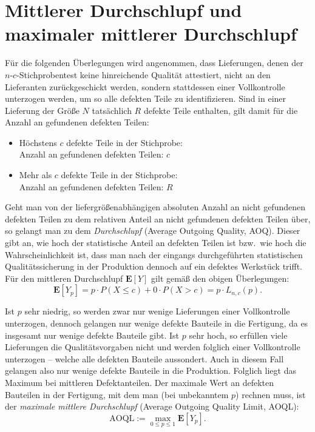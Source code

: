 \documentclass[a4paper,11pt,oneside]{article}
\begin{document}
\section{Mittlerer Durchschlupf und maximaler mittlerer Durchschlupf}

Für die folgenden Überlegungen wird angenommen, dass Lieferungen, denen der $n$-$c$-Stichprobentest keine hinreichende Qualität attestiert, nicht an den Lieferanten zurückgeschickt werden, sondern stattdessen einer Vollkontrolle unterzogen werden, um so alle defekten Teile zu identifizieren. Sind in einer Lieferung der Größe $N$ tatsächlich $R$ defekte Teile enthalten, gilt damit für die Anzahl an gefundenen defekten Teilen:

\begin{itemize}
\item
Höchstens $c$ defekte Teile in der Stichprobe:\\
Anzahl an gefundenen defekten Teilen: $c$
\item
Mehr als $c$ defekte Teile in der Stichprobe:\\
Anzahl an gefundenen defekten Teilen: $R$
\end{itemize}

Geht man von der liefergrößenabhängigen absoluten Anzahl an nicht gefundenen defekten Teilen zu dem relativen Anteil an nicht gefundenen defekten Teilen über, so gelangt man zu dem \emph{Durchschlupf} (Average Outgoing Quality, AOQ). Dieser gibt an, wie hoch der statistische Anteil an defekten Teilen ist bzw.\ wie hoch die Wahrscheinlichkeit ist, dass man nach der eingangs durchgeführten statistischen Qualitätssicherung in der Produktion dennoch auf ein defektes Werkstück trifft. Für den mittleren Durchschlupf $\mathbf{E}[Y]$ gilt gemäß den obigen Überlegungen:
$$
\mathbf{E}[Y_p]=
p\cdot P(X\le c) + 0\cdot P(X>c)=
p\cdot L_{n,c}(p).
$$

Ist $p$ sehr niedrig, so werden zwar nur wenige Lieferungen einer Vollkontrolle unterzogen, dennoch gelangen nur wenige defekte Bauteile in die Fertigung, da es insgesamt nur wenige defekte Bauteile gibt. Ist $p$ sehr hoch, so erfüllen viele Lieferungen die Qualitätsvorgaben nicht und werden folglich einer Vollkontrolle unterzogen -- welche alle defekten Bauteile aussondert. Auch in diesem Fall gelangen also nur wenige defekte Bauteile in die Produktion. Folglich liegt das Maximum bei mittleren Defektanteilen. Der maximale Wert an defekten Bauteilen in der Fertigung, mit dem man (bei unbekanntem $p$) rechnen muss, ist der \emph{maximale mittlere Durchschlupf} (Average Outgoing Quality Limit, AOQL):
$$
\mathrm{AOQL}:=
\max_{0\le p\le1} \mathbf{E}[Y_p].
$$
\end{document}
